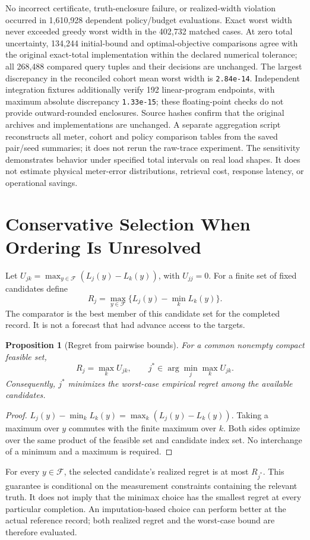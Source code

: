 \documentclass[12pt]{article}
\newtheorem{proposition}{Proposition}
\newcommand{\F}{\mathcal{F}}
\begin{document}
No incorrect certificate, truth-enclosure failure, or realized-width
violation occurred in 1,610,928
dependent policy/budget evaluations. Exact worst width never exceeded
greedy worst width in the 402,732
matched cases. At zero total uncertainty,
134,244 initial-bound
and optimal-objective comparisons agree with the original exact-total
implementation within the declared numerical tolerance;
all 268,488 compared query
tuples and their decisions are unchanged. The largest discrepancy in the
reconciled cohort mean worst width is \texttt{2.84e-14}.
Independent integration fixtures additionally verify
192
linear-program endpoints, with maximum absolute discrepancy
\texttt{1.33e-15}; these floating-point checks
do not provide outward-rounded enclosures. Source hashes confirm that the
original archives and implementations are unchanged.
A separate aggregation script reconstructs all meter, cohort and policy
comparison tables from the saved pair/seed summaries; it does not rerun
the raw-trace experiment.
The sensitivity demonstrates behavior under specified total intervals on
real load shapes. It does not estimate physical meter-error distributions,
retrieval cost, response latency, or operational savings.




\FloatBarrier
\section{Conservative Selection When Ordering Is Unresolved}\label{app:regret}
Let $U_{jk}=\max_{y\in\F}(L_j(y)-L_k(y))$, with $U_{jj}=0$.
For a finite set of fixed candidates define
\begin{equation}
 R_j=\max_{y\in\F}\{L_j(y)-\min_k L_k(y)\}.
 \label{eq:regret}
\end{equation}
The comparator is the best member of this candidate set for the completed
record. It is not a forecast that had advance access to the targets.
\begin{proposition}[Regret from pairwise bounds]
For a common nonempty compact feasible set,
\begin{equation}
 R_j=\max_k U_{jk},\qquad
 j^*\in\arg\min_j\max_k U_{jk}.
 \label{eq:minimax}
\end{equation}
Consequently, $j^*$ minimizes the worst-case empirical regret among the
available candidates.
\end{proposition}
\begin{proof}
$L_j(y)-\min_kL_k(y)=\max_k(L_j(y)-L_k(y))$.
Taking a maximum over $y$ commutes with the finite maximum over $k$.
Both sides optimize over the same product of the feasible set and candidate
index set. No interchange of a minimum and a maximum is required.
\end{proof}
For every $y\in\F$, the selected candidate's realized regret is at most
$R_{j^*}$. This guarantee is conditional on the measurement constraints
containing the relevant truth. It does not imply that the minimax choice
has the smallest regret at every particular completion. An imputation-based
choice can perform better at the actual reference record; both realized
regret and the worst-case bound are therefore evaluated.
\end{document}
